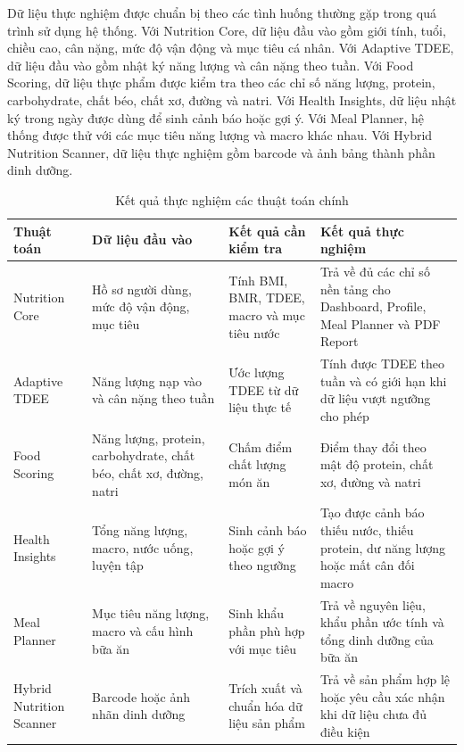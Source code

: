 \documentclass[12pt, a4paper]{report}
\begin{document}
Dữ liệu thực nghiệm được chuẩn bị theo các tình huống thường gặp trong quá trình sử dụng hệ thống. Với Nutrition Core, dữ liệu đầu vào gồm giới tính, tuổi, chiều cao, cân nặng, mức độ vận động và mục tiêu cá nhân. Với Adaptive TDEE, dữ liệu đầu vào gồm nhật ký năng lượng và cân nặng theo tuần. Với Food Scoring, dữ liệu thực phẩm được kiểm tra theo các chỉ số năng lượng, protein, carbohydrate, chất béo, chất xơ, đường và natri. Với Health Insights, dữ liệu nhật ký trong ngày được dùng để sinh cảnh báo hoặc gợi ý. Với Meal Planner, hệ thống được thử với các mục tiêu năng lượng và macro khác nhau. Với Hybrid Nutrition Scanner, dữ liệu thực nghiệm gồm barcode và ảnh bảng thành phần dinh dưỡng.

\begin{table}[htbp]
\centering
\caption{Kết quả thực nghiệm các thuật toán chính}
\begin{tabular}{|p{3cm}|p{3cm}|p{4cm}|p{5cm}|}
\hline
\textbf{Thuật toán} & \textbf{Dữ liệu đầu vào} & \textbf{Kết quả cần kiểm tra} & \textbf{Kết quả thực nghiệm} \\
\hline
Nutrition Core & Hồ sơ người dùng, mức độ vận động, mục tiêu & Tính BMI, BMR, TDEE, macro và mục tiêu nước & Trả về đủ các chỉ số nền tảng cho Dashboard, Profile, Meal Planner và PDF Report \\
\hline
Adaptive TDEE & Năng lượng nạp vào và cân nặng theo tuần & Ước lượng TDEE từ dữ liệu thực tế & Tính được TDEE theo tuần và có giới hạn khi dữ liệu vượt ngưỡng cho phép \\
\hline
Food Scoring & Năng lượng, protein, carbohydrate, chất béo, chất xơ, đường, natri & Chấm điểm chất lượng món ăn & Điểm thay đổi theo mật độ protein, chất xơ, đường và natri \\
\hline
Health Insights & Tổng năng lượng, macro, nước uống, luyện tập & Sinh cảnh báo hoặc gợi ý theo ngưỡng & Tạo được cảnh báo thiếu nước, thiếu protein, dư năng lượng hoặc mất cân đối macro \\
\hline
Meal Planner & Mục tiêu năng lượng, macro và cấu hình bữa ăn & Sinh khẩu phần phù hợp với mục tiêu & Trả về nguyên liệu, khẩu phần ước tính và tổng dinh dưỡng của bữa ăn \\
\hline
Hybrid Nutrition Scanner & Barcode hoặc ảnh nhãn dinh dưỡng & Trích xuất và chuẩn hóa dữ liệu sản phẩm & Trả về sản phẩm hợp lệ hoặc yêu cầu xác nhận khi dữ liệu chưa đủ điều kiện \\
\hline
\end{tabular}
\end{table}
\end{document}
